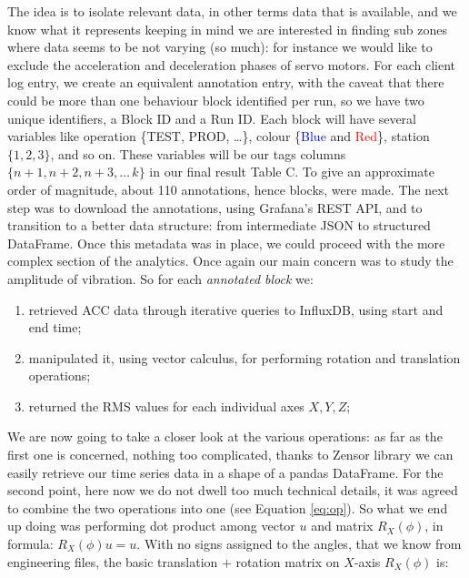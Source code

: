 The idea is to isolate relevant data, in other terms data that is available, and we know what it represents keeping in mind we are interested in finding sub zones 
where data seems to be not varying (so much): for instance we would like to exclude the acceleration and deceleration phases of servo motors.
For each client log entry, we create an equivalent annotation entry, with the caveat that there could be more than one behaviour block identified per run, so we have two unique identifiers, a Block ID and a Run ID. 
Each block will have several variables like operation \{TEST, PROD, \dots\}, colour \{\textcolor{blue}{Blue} and \textcolor{red}{Red}\}, station $\{1,2,3\}$, and so on. 
These variables will be our tags columns $\{n+1, n+2, n+3, \dots\, k\}$ in our final result Table C. To give an approximate order of magnitude, about 110 annotations, hence blocks, were made.
The next step was to download the annotations, using Grafana's REST API, and to transition to a better data structure: from intermediate JSON to structured DataFrame.
Once this metadata was in place, we could proceed with the more complex section of the analytics.
Once again our main concern was to study the amplitude of vibration. So for each \emph{annotated block} we: 
\begin{enumerate}
    \item retrieved ACC data through iterative queries to InfluxDB, using start and end time;
    \item manipulated it, using vector calculus, for performing rotation and translation operations;
    \item returned the \ac{RMS} values for each individual axes $X,Y,Z$;
\end{enumerate}
We are now going to take a closer look at the various operations: %
as far as the first one is concerned, nothing too complicated, thanks to Zensor library we can easily retrieve our time series data in a shape of a pandas DataFrame.
For the second point, here now we do not dwell too much technical details, it was agreed to combine the two operations into one (see Equation \ref{eq:op}).
So what we end up doing was performing dot product among vector $u$ and matrix $R_X(\phi)$, in formula: $R_X(\phi)u = u$.
With no signs assigned to the angles, that we know from engineering files, the basic translation $+$ rotation matrix on $X$-axis $R_X(\phi)$ is:

